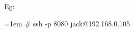 \begin{flushleft}
\begin{itemize}
\begin{itemize}
		Eg:
		\begin{tcolorbox}[breakable,notitle,boxrule=-0pt,colback=black,colframe=black]
			\color{green}
			\font=1em
			\# ssh -p 8080 jack@192.168.0.105
			\font=4pt
		\end{tcolorbox}
		
	\end{itemize}
	
	
	
	
	
	
\end{itemize}





\end{flushleft}
\newpage


